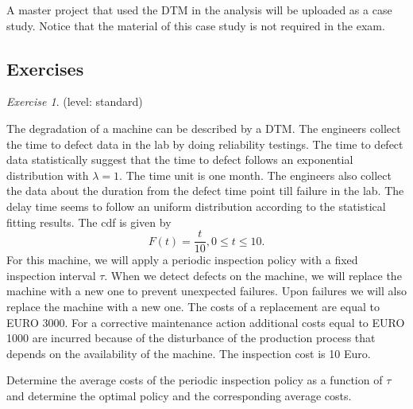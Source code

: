 \documentclass[10pt,a4paper]{article}
\theoremstyle{remark}
\newtheorem{exercise}{Exercise}
\begin{document}
A master project that used the DTM in the analysis will be uploaded as a case study. Notice that the material of this case study is not required in the exam.
\subsection{Exercises}

\begin{exercise} \label{exercise:DTM1}
(level: standard)

The degradation of a machine can be described by a DTM. The engineers collect the time to defect data in the lab by doing reliability testings. The time to defect data statistically suggest that the time to defect follows an exponential distribution with $\lambda=1$. The time unit is one month. The engineers also collect the data about the duration from the defect time point till failure in the lab. The delay time seems to follow an uniform distribution according to the statistical fitting results. The cdf is given by
\begin{equation*}
F(t)=\dfrac{t}{10}, 0\leq t\leq 10.
\end{equation*} 
For this machine, we will apply a periodic inspection policy with a fixed inspection interval $\tau$. When we detect defects on the machine, we will replace the machine with a new one to prevent unexpected failures. Upon failures we will also replace the machine with a new one. The costs of a replacement are equal to EURO 3000. For a corrective maintenance
action additional costs equal to EURO 1000 are incurred because of the disturbance of the production process that depends on the availability of the machine. The inspection cost is 10 Euro.

Determine the average costs of the periodic inspection policy as a function of $\tau$ and determine the optimal policy and the corresponding average costs.
\end{exercise}
\end{document}
